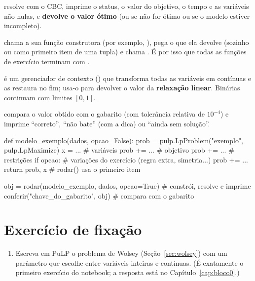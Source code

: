 \begin{description}[style=nextline]
  \item[\py{resolver(prob, mostrar=True, variaveis=True)}] resolve com o CBC, imprime o status, o valor do objetivo, o
  tempo e as variáveis não nulas, e \textbf{devolve o valor ótimo} (ou  se não for ótimo ou se o modelo
  estiver incompleto).
  \item[\py{rodar(construtor, *args, **kwargs)}] chama a sua função construtora (por exemplo,
  ), pega o  que ela devolve (sozinho ou como primeiro item de uma tupla) e chama
  . É por isso que todas as funções de exercício terminam com .
  \item[\py{relaxado(prob)} e \py{valor_relaxado(prob)}]  é um gerenciador de contexto
  () que transforma todas as variáveis em contínuas e as restaura no fim;  usa-o para
  devolver o valor da \textbf{relaxação linear}. Binárias continuam com limites $[0,1]$.
  \item[\py{conferir(chave, obtido, dica="")}] compara o valor obtido com o gabarito  (com
  tolerância relativa de $10^{-4}$) e imprime ``correto'', ``não bate'' (com a dica) ou ``ainda sem solução''.
\end{description}

\begin{exemplo}
\begin{codigo}
def modelo_exemplo(dados, opcao=False):
    prob = pulp.LpProblem("exemplo", pulp.LpMaximize)
    x = ...                     # variáveis
    prob += ...                 # objetivo
    prob += ...                 # restrições
    if opcao:                   # variações do exercício (regra extra, simetria...)
        prob += ...
    return prob, x              # rodar() usa o primeiro item

obj = rodar(modelo_exemplo, dados, opcao=True)   # constrói, resolve e imprime
conferir("chave_do_gabarito", obj)               # compara com o gabarito
\end{codigo}
\end{exemplo}

\section*{Exercício de fixação}
\begin{enumerate}[label=\textbf{5.\arabic*}]
  \item Escreva em PuLP o problema de Wolsey (Seção~\ref{sec:wolsey}) com um parâmetro  que escolhe entre
  variáveis inteiras e contínuas. (É exatamente o primeiro exercício do notebook; a resposta está no
  Capítulo~\ref{cap:bloco0}.)
\end{enumerate}
